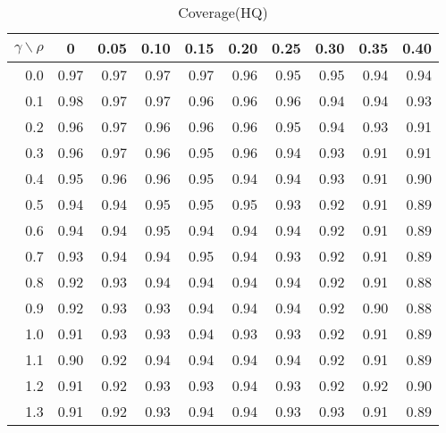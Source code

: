 \documentclass[12pt]{article}
\begin{document}
%
\begin{table}[!tbp]
\caption{Coverage(HQ)}
 \begin{center}
 \begin{tabular}{r|rrrrrrrrr}\hline\hline
\multicolumn{1}{c|}{$\gamma\backslash\rho$}&\multicolumn{1}{c}{0}&\multicolumn{1}{c}{0.05}&\multicolumn{1}{c}{0.10}&\multicolumn{1}{c}{0.15}&\multicolumn{1}{c}{0.20}&\multicolumn{1}{c}{0.25}&\multicolumn{1}{c}{0.30}&\multicolumn{1}{c}{0.35}&\multicolumn{1}{c}{0.40}\tabularnewline
\hline
0.0&0.97&0.97&0.97&0.97&0.96&0.95&0.95&0.94&0.94\tabularnewline
0.1&0.98&0.97&0.97&0.96&0.96&0.96&0.94&0.94&0.93\tabularnewline
0.2&0.96&0.97&0.96&0.96&0.96&0.95&0.94&0.93&0.91\tabularnewline
0.3&0.96&0.97&0.96&0.95&0.96&0.94&0.93&0.91&0.91\tabularnewline
0.4&0.95&0.96&0.96&0.95&0.94&0.94&0.93&0.91&0.90\tabularnewline
0.5&0.94&0.94&0.95&0.95&0.95&0.93&0.92&0.91&0.89\tabularnewline
0.6&0.94&0.94&0.95&0.94&0.94&0.94&0.92&0.91&0.89\tabularnewline
0.7&0.93&0.94&0.94&0.95&0.94&0.93&0.92&0.91&0.89\tabularnewline
0.8&0.92&0.93&0.94&0.94&0.94&0.94&0.92&0.91&0.88\tabularnewline
0.9&0.92&0.93&0.93&0.94&0.94&0.94&0.92&0.90&0.88\tabularnewline
1.0&0.91&0.93&0.93&0.94&0.93&0.93&0.92&0.91&0.89\tabularnewline
1.1&0.90&0.92&0.94&0.94&0.94&0.94&0.92&0.91&0.89\tabularnewline
1.2&0.91&0.92&0.93&0.93&0.94&0.93&0.92&0.92&0.90\tabularnewline
1.3&0.91&0.92&0.93&0.94&0.94&0.93&0.93&0.91&0.89\tabularnewline
\hline
\end{tabular}

\end{center}

\end{table}
\end{document}
